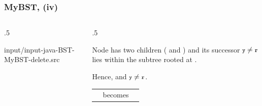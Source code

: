 \documentclass[10pt]{beamer}
\begin{document}
\begin{frame}[t]\frametitle{MyBST,  (iv)}
	\vspace{-0.3cm}
	\begin{columns}[T] %
	\begin{column}{.5\linewidth} %
		{\tiny 
			
				{input/input-java-BST-MyBST-delete.src}
		} %
	\end{column} %
	\begin{column}{.5\linewidth} %
		{\tiny 
		\begin{example}
		Node  has two children (\hCode{$\ell$} and )
		and its successor $\hCode{y} \neq {}$ lies within the subtree rooted at  \hCode{r}.
		
		Hence,
		 and $\hCode{y} \neq \hCode{r}$.
		\begin{center}
			\begin{tabular}{c c c}
				\adjustbox{valign=t}{			
					
				} %
				& becomes
				&
				\adjustbox{valign=t}{	
					
				} %
			\end{tabular}
		\end{center}
		\end{example}
		} %
	\end{column} %
	\end{columns} %

\end{frame}




\end{document}
